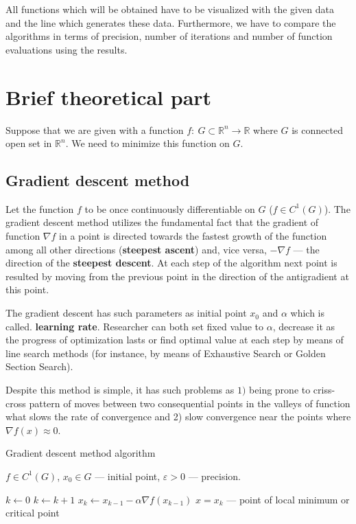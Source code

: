 \documentclass[12pt, bachelor, substylefile = algo_title.rtx]{disser}
\newcommand{\eps}{\varepsilon}
\newcommand{\Real}{\mathbb{R}}
\theoremstyle{definition}
\begin{document}
All functions which will be obtained have to be visualized with the given data and the line which generates these data. Furthermore, we have to compare the algorithms in terms of precision, number of iterations and number of function evaluations using the results.

\section{Brief theoretical part}

Suppose that we are given with a function $f:\ G \subset \Real^n \to \Real$ where $G$ is connected open set in $\Real^n$. We need to minimize this function on $G$.

\subsection{Gradient descent method}
Let the function $f$ to be once continuously differentiable on $G$ ($f \in C^1(G)$). The gradient descent method utilizes the fundamental fact that the gradient of function $\nabla f$ in a point is directed towards the fastest growth of the function among all other directions (\textbf{steepest ascent}) and, vice versa, $-\nabla f$ --- the direction of the \textbf{steepest descent}. At each step of the algorithm next point is resulted by moving from the previous point in the direction of the antigradient at this point. 

The gradient descent has such parameters as initial point $x_0$ and $\alpha$ which is called. \textbf{learning rate}. Researcher can both set fixed value to $\alpha$, decrease it as the progress of optimization lasts or find optimal value at each step by means of line search methods (for instance, by means of Exhaustive Search or Golden Section Search).

Despite this method is simple, it has such problems as $1)$ being prone to criss-cross pattern of moves between two consequential points in the valleys of function what slows the rate of convergence and 2) slow convergence near the points where $\nabla f(x) \approx 0$.

\begin{algorithm}[h]
\caption{Gradient descent method algorithm}
\label{alg: graddesc}
\begin{algorithmic}

\Require $f \in C^1(G)$, $x_0 \in G$ --- initial point, $\eps>0$ --- precision. 

\State $k \gets 0$
\While{$\|x_k - x_{k-1}\| > \eps$}
\State $k \gets k+1$
\State $x_k \gets x_{k-1} - \alpha \nabla f(x_{k-1})$
\EndWhile
\Ensure $\widehat{x} = x_k$ --- point of local minimum or critical point
\end{algorithmic}
\end{algorithm}
\end{document}
